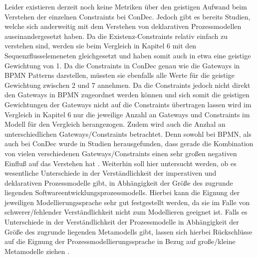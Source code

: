 Leider existieren derzeit noch keine Metriken über den geistigen Aufwand beim Verstehen der einzelnen Constraints bei ConDec. Jedoch gibt es bereits Studien, welche sich anderweitig mit dem Verstehen von deklarativen Prozessmodellen auseinandergesetzt haben. Da die Existenz-Constraints relativ einfach zu verstehen sind, werden sie beim Vergleich in Kapitel 6 mit den Sequenzflusselemeneten gleichgesetzt und haben somit auch in etwa eine geistige Gewichtung von 1. Da die Constraints in ConDec genau wie die Gateways in BPMN Patterns darstellen, müssten sie ebenfalls alle Werte für die geistige Gewichtung zwischen 2 und 7 annehmen. Da die Constraints jedoch nicht direkt den Gateways in BPMN zugeordnet werden können und sich somit die geistigen Gewichtungen der Gateways nicht auf die Constraints übertragen lassen wird im Vergleich in Kapitel 6 nur die jeweilige Anzahl an Gateways und Constraints im Modell für den Vergleich herangezogen. Zudem wird auch die Anzhal an unterschiedlichen Gateways/Constraints betrachtet. Denn sowohl bei BPMN, als auch bei ConDec wurde in Studien herausgefunden, dass gerade die Kombination von vielen verschiedenen Gateways/Constraints einen sehr großen negativen Einfluß auf das Verstehen hat \cite{gruhn2006adopting, thesis_maja,haisjackl2014understanding}. \newline
Weiterhin soll hier untersucht werden, ob es wesentliche Unterschiede in der Verständlichkeit der imperativen und deklarativen Prozessmodelle gibt, in Abhängigkeit der Größe des zugrunde liegenden Softwareentwicklungsprozessmodells. Hierbei kann die Eignung der jeweiligen Modellierungssprache sehr gut festgestellt werden, da sie im Falle von schwerer/fehlender Verständlichkeit nicht zum Modellieren geeignet ist. Falls es Unterschiede in der Verständlichkeit der Prozessmodelle in Abhängigkeit der Größe des zugrunde liegenden Metamodells gibt, lassen sich hierbei Rückschlüsse auf die Eignung der Prozessmodellierungssprache in Bezug auf große/kleine Metamodelle ziehen \cite{leimeister2012,journals95, freund2007,reinshagen2009, becker2012prozessmanagement,koch2011,bpm07,thesis_maja}.


